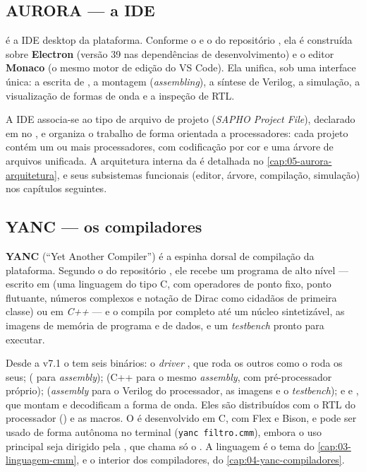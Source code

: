 \subsection{AURORA --- a IDE}
\label{sec:01-aurora}

 é a IDE desktop da plataforma. Conforme o  e o
 do repositório , ela é construída sobre
\textbf{Electron} (versão 39 nas dependências de desenvolvimento) e o editor
\textbf{Monaco} (o mesmo motor de edição do VS Code). Ela unifica, sob uma
interface única: a escrita de \cmm{}, a montagem (\emph{assembling}), a síntese
de Verilog, a simulação, a visualização de formas de onda e a inspeção de RTL.

A IDE associa-se ao tipo de arquivo de projeto \textbf{} (\emph{SAPHO
Project File}), declarado em  no , e
organiza o trabalho de forma orientada a processadores: cada projeto contém um
ou mais processadores, com codificação por cor e uma árvore de arquivos
unificada. A arquitetura interna da  é detalhada no
\autoref{cap:05-aurora-arquitetura}, e seus subsistemas funcionais (editor,
árvore, compilação, simulação) nos capítulos seguintes.

\subsection{YANC --- os compiladores}
\label{sec:01-yanc}

\textbf{YANC} (\enquote{Yet Another Compiler}) é a espinha dorsal de compilação
da plataforma. Segundo o  do repositório , ele recebe
um programa de alto nível --- escrito em \cmm{} (uma linguagem do tipo C, com
operadores de ponto fixo, ponto flutuante, números complexos e notação de Dirac
como cidadãos de primeira classe) ou em \emph{C++} --- e o compila por completo
até um núcleo  sintetizável, as imagens de memória de programa e de
dados, e um \emph{testbench} pronto para executar.

Desde a v7.1 o  tem seis binários: o \emph{driver} , que
roda os outros como o  roda os seus;  (\cmm{} para
\emph{assembly});  (C++ para o mesmo \emph{assembly}, com
pré-processador próprio);  (\emph{assembly} para o Verilog do
processador, as imagens  e o \emph{testbench}); e  e
, que montam e decodificam a forma de onda. Eles são
distribuídos com o RTL do processador () e as macros. O
 é desenvolvido em C, com Flex e Bison, e pode ser usado de forma
autônoma no terminal (\lstinline|yanc filtro.cmm|), embora o uso principal seja
dirigido pela , que chama só o . A linguagem \cmm{} é o tema do
\autoref{cap:03-linguagem-cmm}, e o interior dos compiladores, do
\autoref{cap:04-yanc-compiladores}.

